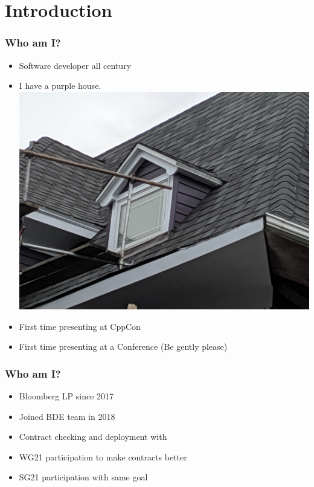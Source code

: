 \section{Introduction}
\begin{frame}
  \frametitle{Who am I?}
  \begin{itemize}
  \item Software developer all century
  \item I have a purple house.
    \includegraphics[height=0.25\textheight]{purpledormer}
  \item First time presenting at CppCon
  \item First time presenting at a Conference \pause (Be gently please)
  \end{itemize}
\end{frame}
\begin{frame}
  \frametitle{Who am I?}
  \begin{itemize}
  \item Bloomberg LP since 2017
  \item Joined BDE team in 2018
  \item Contract checking and deployment with 
  \item WG21 participation to make contracts better
  \item SG21 participation with same goal
  \end{itemize}
\end{frame}
